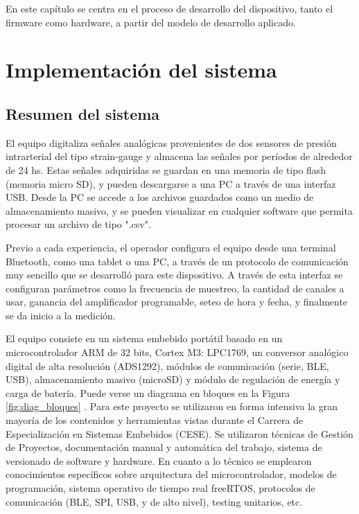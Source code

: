 
En este capítulo se centra en el proceso de desarrollo del dispositivo, tanto el firmware como hardware, a partir del modelo de desarrollo aplicado.


\section{Implementación del sistema}

\subsection{Resumen del sistema}

El equipo digitaliza señales analógicas provenientes de dos sensores de presión intrarterial del tipo strain-gauge y almacena las señales por períodos de alrededor de 24 hs. Estas señales adquiridas se guardan en una memoria de tipo flash (memoria micro SD), y pueden descargarse a una PC a través de una interfaz USB. Desde la PC se accede a los archivos guardados como un medio de almacenamiento masivo, y se pueden visualizar en cualquier software que permita procesar un archivo de tipo ".csv".

Previo a cada experiencia, el operador configura el equipo desde una terminal Bluetooth, como una tablet o una PC, a través de un protocolo de comunicación muy sencillo que se desarrolló para este dispositivo. A través de esta interfaz se configuran parámetros como la frecuencia de muestreo, la cantidad de canales a usar, ganancia del amplificador programable, seteo de hora y fecha, y finalmente se da inicio a la medición. 

El equipo consiste en un sistema embebido portátil basado en un microcontrolador ARM de 32 bits, Cortex M3: LPC1769, un conversor analógico digital de alta resolución (ADS1292), módulos de comunicación (serie, BLE, USB), almacenamiento masivo (microSD) y módulo de regulación de energía y carga de batería. Puede verse un diagrama en bloques en la Figura \ref{fig:diag_bloques} . Para este proyecto se utilizaron en forma intensiva la gran mayoría de los contenidos y herramientas vistas durante el Carrera de Especialización en Sistemas Embebidos (CESE). Se utilizaron técnicas de Gestión de Proyectos, documentación manual y automática del trabajo, sistema de versionado de software y hardware. En cuanto a lo técnico se emplearon conocimientos específicos sobre arquitectura del microcontrolador, modelos de programación, sistema operativo de tiempo real freeRTOS, protocolos de comunicación (BLE, SPI, USB, y de alto nivel), testing unitarios, etc.


